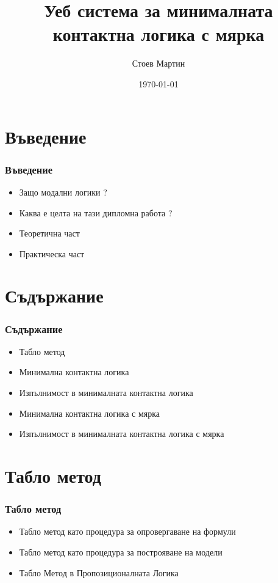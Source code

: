 \documentclass{beamer}
\begin{document}
\title{Уеб система за минималната контактна логика с мярка}  
\author{Стоев Мартин}
\date{\today} 
\begin{frame}
\titlepage
\end{frame}



\section{Въведение} 
\begin{frame}\frametitle{Въведение}
\begin{itemize}
	\item Защо модални логики ?
	\item Каква е целта на тази дипломна работа ?
	\item Теоретична част
	\item Практическа част
\end{itemize}
\end{frame}

\section{Съдържание} 
\begin{frame}\frametitle{Съдържание}
\begin{itemize}
	\item Табло метод
	\item Минимална контактна логика
	\item Изпълнимост в минималната контактна логика
	\item Минимална контактна логика с мярка
	\item Изпълнимост в минималната контактна логика с мярка
\end{itemize}
\end{frame}

\section{Табло метод}
\begin{frame}\frametitle{Табло метод}
\begin{itemize}
	\item Табло метод като процедура за опровергаване на формули
	\item Табло метод като процедура за построяване на модели
	\item Табло Метод в Пропозиционалната Логика
\end{itemize}
\end{frame}
\end{document}

